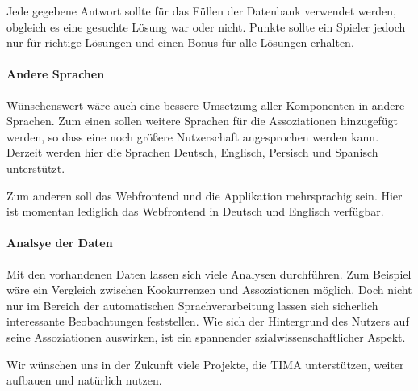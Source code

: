 Jede gegebene Antwort sollte für das Füllen der Datenbank verwendet werden, obgleich
es eine gesuchte Lösung war oder nicht. Punkte sollte ein Spieler jedoch nur
für richtige Lösungen und einen Bonus für alle Lösungen erhalten.

\paragraph{Andere Sprachen}
Wünschenswert wäre auch eine bessere Umsetzung aller Komponenten in andere Sprachen.
Zum einen sollen weitere Sprachen für die Assoziationen hinzugefügt werden, so dass eine noch größere Nutzerschaft angesprochen werden kann. Derzeit werden hier die Sprachen Deutsch, Englisch, Persisch und Spanisch unterstützt.

Zum anderen soll das Webfrontend und die Applikation mehrsprachig sein. Hier ist momentan lediglich das Webfrontend in Deutsch und Englisch verfügbar.

\paragraph{Analsye der Daten}
Mit den vorhandenen Daten lassen sich viele Analysen durchführen. Zum Beispiel wäre ein Vergleich zwischen Kookurrenzen und Assoziationen möglich. Doch nicht nur im Bereich der automatischen Sprachverarbeitung lassen sich sicherlich interessante Beobachtungen feststellen. Wie sich der Hintergrund des Nutzers auf seine Assoziationen auswirken, ist ein spannender szialwissenschaftlicher Aspekt.

Wir wünschen uns in der Zukunft viele Projekte, die TIMA unterstützen, weiter aufbauen und natürlich nutzen.
